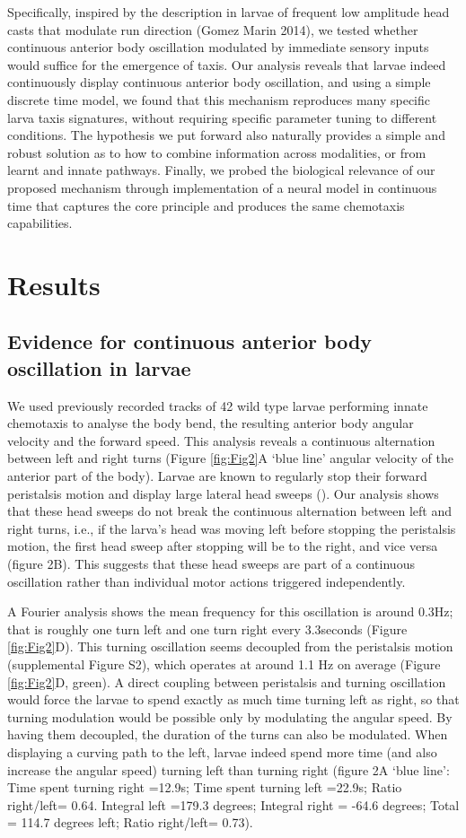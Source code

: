 \documentclass[10pt,a4paper]{article}
\begin{document}
Specifically, inspired by the description in larvae of frequent low amplitude head casts that modulate run direction (Gomez Marin 2014), we tested whether continuous anterior body oscillation modulated by immediate sensory inputs would suffice for the emergence of taxis. Our analysis reveals that larvae indeed continuously display continuous anterior body oscillation, and using a simple discrete time model, we found that this mechanism reproduces many specific larva taxis signatures, without requiring specific parameter tuning to different conditions. The hypothesis we put forward also naturally provides a simple and robust solution as to how to combine information across modalities, or from learnt and innate pathways. Finally, we probed the biological relevance of our proposed mechanism through implementation of a neural model in continuous time that captures the core principle and produces the same chemotaxis capabilities.

\section{Results}
\subsection{Evidence for continuous anterior body oscillation in larvae}
We used previously recorded tracks of 42 wild type larvae performing innate chemotaxis \citep{gomez2012active} to analyse the body bend, the resulting anterior body angular velocity and the forward speed. This analysis reveals a continuous alternation between left and right turns (Figure \ref{fig:Fig2}A ‘blue line’ angular velocity of the anterior part of the body). Larvae are known to regularly stop their forward peristalsis motion and display large lateral head sweeps (). Our analysis shows that these head sweeps do not break the continuous alternation between left and right turns, i.e., if the larva’s head was moving left before stopping the peristalsis motion, the first head sweep after stopping will be to the right, and vice versa (figure 2B). This suggests that these head sweeps are part of a continuous oscillation rather than individual motor actions triggered independently.

A Fourier analysis shows the mean frequency for this oscillation is around 0.3Hz; that is roughly one turn left and one turn right every 3.3seconds (Figure \ref{fig:Fig2}D). This turning oscillation seems decoupled from the peristalsis motion (supplemental Figure S2), which operates at around 1.1 Hz on average (Figure \ref{fig:Fig2}D, green). A direct coupling between peristalsis and turning oscillation would force the larvae to spend exactly as much time turning left as right, so that turning modulation would be possible only by modulating the angular speed. By having them decoupled, the duration of the turns can also be modulated. When displaying a curving path to the left, larvae indeed spend more time (and also increase the angular speed) turning left than turning right (figure 2A ‘blue line’:  Time spent turning right =12.9s; Time spent turning left =22.9s; Ratio right/left= 0.64. Integral left =179.3 degrees; Integral right = -64.6 degrees; Total = 114.7 degrees left; Ratio right/left= 0.73).
\end{document}
